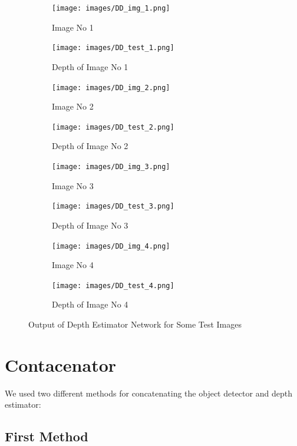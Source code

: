 \documentclass[a4paper, openany]{book}
\begin{document}
\begin{figure}[ht]
  \centering
  \begin{subfigure}[b]{0.3\linewidth}
    \texttt{[image: images/DD\_img\_1.png]}
    \caption{Image No 1}
  \end{subfigure}
  \begin{subfigure}[b]{0.3\linewidth}
    \texttt{[image: images/DD\_test\_1.png]}
    \caption{Depth of Image No 1}
  \end{subfigure}
  
    \begin{subfigure}[b]{0.3\linewidth}
    \texttt{[image: images/DD\_img\_2.png]}
    \caption{Image No 2}
  \end{subfigure}
  \begin{subfigure}[b]{0.3\linewidth}
    \texttt{[image: images/DD\_test\_2.png]}
    \caption{Depth of  Image No 2}
  \end{subfigure}
  
  \begin{subfigure}[b]{0.3\linewidth}
    \texttt{[image: images/DD\_img\_3.png]}
    \caption{Image No 3}
  \end{subfigure}
    \begin{subfigure}[b]{0.3\linewidth}
    \texttt{[image: images/DD\_test\_3.png]}
    \caption{Depth of Image No 3}
  \end{subfigure}
  
  \begin{subfigure}[b]{0.3\linewidth}
    \texttt{[image: images/DD\_img\_4.png]}
    \caption{Image No 4}
  \end{subfigure}
  \begin{subfigure}[b]{0.3\linewidth}
    \texttt{[image: images/DD\_test\_4.png]}
    \caption{Depth of Image No 4}
  \end{subfigure}
  
  \caption{Output of Depth Estimator Network for Some Test Images}
  \label{fig:DD_t_images}
\end{figure}

\newpage
	
\section{Contacenator}
	\vspace{0.3cm}

We used two different methods for concatenating the object detector and depth estimator:


\subsection{First Method}
	\vspace{0.3cm}
\end{document}
